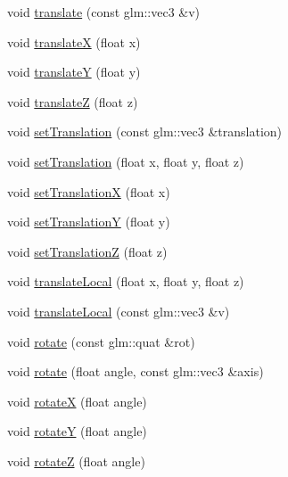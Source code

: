 \begin{DoxyCompactItemize}
void \mbox{\hyperlink{classec_1_1_transform3_d_ae0290297c16ee5ce4f6cf2855fd26aa0}{translate}} (const glm\+::vec3 \&v)
\item 
void \mbox{\hyperlink{classec_1_1_transform3_d_a6e8e6da470c6a080b669cd619e8554ef}{translateX}} (float x)
\item 
void \mbox{\hyperlink{classec_1_1_transform3_d_ab0c9d7ff73b744c480914b7d2aaabf81}{translateY}} (float y)
\item 
void \mbox{\hyperlink{classec_1_1_transform3_d_a13ea4d1c69ec17c2ce4c1d8b4068639a}{translateZ}} (float z)
\item 
void \mbox{\hyperlink{classec_1_1_transform3_d_a2866183fe28eb5e5360d156830b00655}{set\+Translation}} (const glm\+::vec3 \&translation)
\item 
void \mbox{\hyperlink{classec_1_1_transform3_d_a2671c96409a11a74d9c7cb96d96b274b}{set\+Translation}} (float x, float y, float z)
\item 
void \mbox{\hyperlink{classec_1_1_transform3_d_a51d65455864ed3595a53c40d2f576067}{set\+TranslationX}} (float x)
\item 
void \mbox{\hyperlink{classec_1_1_transform3_d_aa9d5eab59374d5e900c17c02a4c64b2f}{set\+TranslationY}} (float y)
\item 
void \mbox{\hyperlink{classec_1_1_transform3_d_aeddca7f4f74afd8394810222684fad30}{set\+TranslationZ}} (float z)
\item 
void \mbox{\hyperlink{classec_1_1_transform3_d_aa32ee07603a9531e77b189185cbd40e4}{translate\+Local}} (float x, float y, float z)
\item 
void \mbox{\hyperlink{classec_1_1_transform3_d_a8769dc2eb4f1cd467d8e39c85decdd10}{translate\+Local}} (const glm\+::vec3 \&v)
\item 
void \mbox{\hyperlink{classec_1_1_transform3_d_a24885ce6a9f002a00f7c263e4076ea6b}{rotate}} (const glm\+::quat \&rot)
\item 
void \mbox{\hyperlink{classec_1_1_transform3_d_ac9787bc7e772a5ef4f9a7ed36be1ae10}{rotate}} (float angle, const glm\+::vec3 \&axis)
\item 
void \mbox{\hyperlink{classec_1_1_transform3_d_a620c1729b027b54d0cabe03a8cdc9253}{rotateX}} (float angle)
\item 
void \mbox{\hyperlink{classec_1_1_transform3_d_a3e365a26befa6aabeb2e0b3ca680dd4f}{rotateY}} (float angle)
\item 
void \mbox{\hyperlink{classec_1_1_transform3_d_afb339cf9f8c44fa6db954eb82af63c5b}{rotateZ}} (float angle)
\item 

\end{DoxyCompactItemize}
